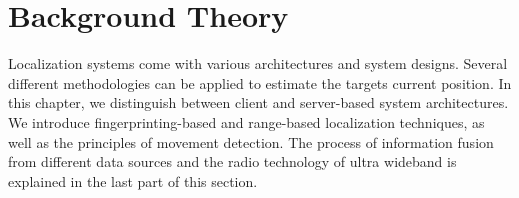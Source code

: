 
\chapter{Background Theory} %

\label{Chapter3} %
Localization systems come with various architectures and system designs. Several different methodologies can be applied to estimate the targets current position. In this chapter, we distinguish between client and server-based system architectures. We introduce fingerprinting-based and range-based localization techniques, as well as the principles of movement detection. The process of information fusion from different data sources and the radio technology of ultra wideband is explained in the last part of this section.

